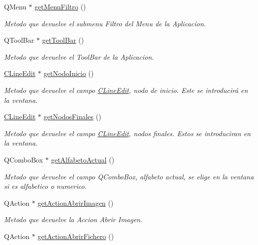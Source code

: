 \begin{DoxyCompactItemize}
Q\+Menu $\ast$ \hyperlink{classCAplicacion_aa234ca246ac29bfca8c8f8fc39e07206}{get\+Menu\+Filtro} ()
\begin{DoxyCompactList}\small\item\em Metodo que devuelve el submenu Filtro del Menu de la Aplicacion. \end{DoxyCompactList}\item 
Q\+Tool\+Bar $\ast$ \hyperlink{classCAplicacion_a7cc8e6f81a363c5fec003c811e7f2618}{get\+Tool\+Bar} ()
\begin{DoxyCompactList}\small\item\em Metodo que devuelve el Tool\+Bar de la Aplicacion. \end{DoxyCompactList}\item 
\hyperlink{classCLineEdit}{C\+Line\+Edit} $\ast$ \hyperlink{classCAplicacion_af85f5505cf86de4ea460765b0032fa4f}{get\+Nodo\+Inicio} ()
\begin{DoxyCompactList}\small\item\em Metodo que devuelve el campo \hyperlink{classCLineEdit}{C\+Line\+Edit}, nodo de inicio. Este se introducirá en la ventana. \end{DoxyCompactList}\item 
\hyperlink{classCLineEdit}{C\+Line\+Edit} $\ast$ \hyperlink{classCAplicacion_a17a77e146a8a785cbf92158c9b7240df}{get\+Nodos\+Finales} ()
\begin{DoxyCompactList}\small\item\em Metodo que devuelve el campo \hyperlink{classCLineEdit}{C\+Line\+Edit}, nodos finales. Estos se introduciran en la ventana. \end{DoxyCompactList}\item 
Q\+Combo\+Box $\ast$ \hyperlink{classCAplicacion_a41b85abfacd73ff66a345d08b934bc45}{get\+Alfabeto\+Actual} ()
\begin{DoxyCompactList}\small\item\em Metodo que devuelve el campo Q\+Combo\+Box, alfabeto actual, se elige en la ventana si es alfabetico o numerico. \end{DoxyCompactList}\item 
Q\+Action $\ast$ \hyperlink{classCAplicacion_a8016e78de08ca0dfb1e74750a0fcacf1}{get\+Action\+Abrir\+Imagen} ()
\begin{DoxyCompactList}\small\item\em Metodo que devuelve la Accion Abrir Imagen. \end{DoxyCompactList}\item 
Q\+Action $\ast$ \hyperlink{classCAplicacion_adf620887eb4c888ec7bbe1178df9d307}{get\+Action\+Abrir\+Fichero} ()

\end{DoxyCompactItemize}
